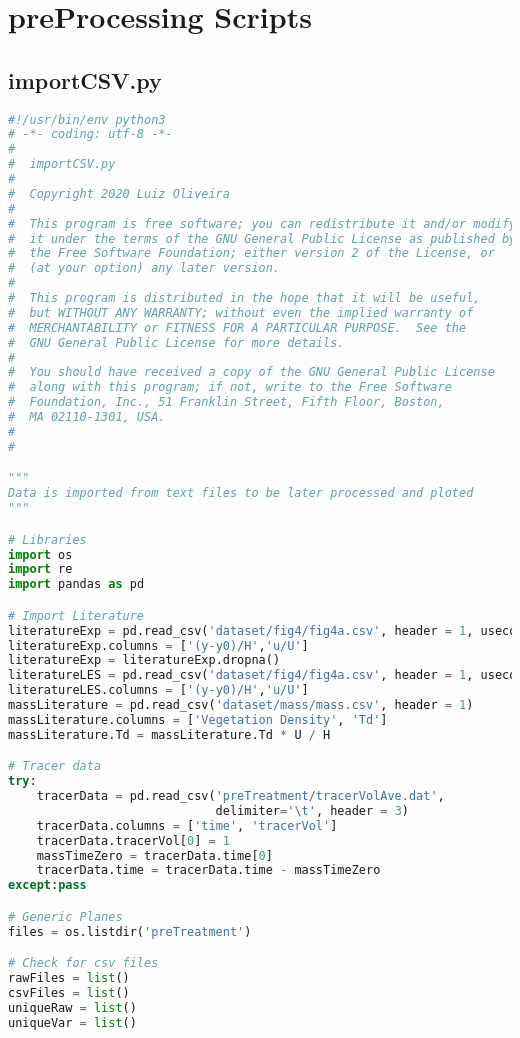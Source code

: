 \section{preProcessing Scripts}
\subsection{importCSV.py}
\begin{lstlisting}[language=python]
#!/usr/bin/env python3
# -*- coding: utf-8 -*-
#
#  importCSV.py
#  
#  Copyright 2020 Luiz Oliveira
#  
#  This program is free software; you can redistribute it and/or modify
#  it under the terms of the GNU General Public License as published by
#  the Free Software Foundation; either version 2 of the License, or
#  (at your option) any later version.
#  
#  This program is distributed in the hope that it will be useful,
#  but WITHOUT ANY WARRANTY; without even the implied warranty of
#  MERCHANTABILITY or FITNESS FOR A PARTICULAR PURPOSE.  See the
#  GNU General Public License for more details.
#  
#  You should have received a copy of the GNU General Public License
#  along with this program; if not, write to the Free Software
#  Foundation, Inc., 51 Franklin Street, Fifth Floor, Boston,
#  MA 02110-1301, USA.
#  
#  

"""
Data is imported from text files to be later processed and ploted
"""

# Libraries
import os
import re
import pandas as pd

# Import Literature
literatureExp = pd.read_csv('dataset/fig4/fig4a.csv', header = 1, usecols=(0,1))
literatureExp.columns = ['(y-y0)/H','u/U']
literatureExp = literatureExp.dropna()
literatureLES = pd.read_csv('dataset/fig4/fig4a.csv', header = 1, usecols=(2,3))
literatureLES.columns = ['(y-y0)/H','u/U']
massLiterature = pd.read_csv('dataset/mass/mass.csv', header = 1)
massLiterature.columns = ['Vegetation Density', 'Td']
massLiterature.Td = massLiterature.Td * U / H

# Tracer data
try:
    tracerData = pd.read_csv('preTreatment/tracerVolAve.dat',
                             delimiter='\t', header = 3)
    tracerData.columns = ['time', 'tracerVol']
    tracerData.tracerVol[0] = 1
    massTimeZero = tracerData.time[0]
    tracerData.time = tracerData.time - massTimeZero
except:pass

# Generic Planes
files = os.listdir('preTreatment')

# Check for csv files
rawFiles = list()
csvFiles = list()
uniqueRaw = list()
uniqueVar = list()


\end{lstlisting}
